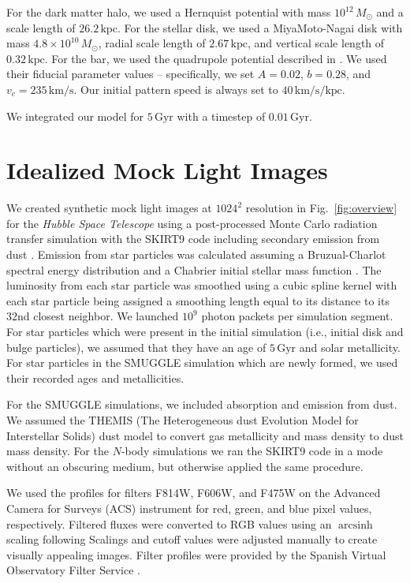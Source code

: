 \documentclass[fleqn,usenatbib]{mnras}
\newcommand{\kms}{\ensuremath{\textrm{km}/\textrm{s}}}
\newcommand{\Nbody}{$N$-body}
\newcommand{\Msun}{\ensuremath{M_{\odot}}}
\DeclareMathOperator\arcsinh{arcsinh}
\begin{document}
For the dark matter halo, we used a Hernquist potential
\citep{1990ApJ...356..359H} with mass $10^{12}\,\Msun$ and a scale length of
$26.2\,\textrm{kpc}$. For the stellar disk, we used a MiyaMoto-Nagai disk
\citep{1975PASJ...27..533M} with mass $4.8\times10^{10}\,\Msun$, radial scale
length of $2.67\,\textrm{kpc}$, and vertical scale length of
$0.32\,\textrm{kpc}$. For the bar, we used the quadrupole potential described in
\citet{2022MNRAS.513..768C}. We used their fiducial parameter values --
specifically, we set $A=0.02$, $b=0.28$, and $v_c = 235\,\kms$. Our initial
pattern speed is always set to $40\,\kms/\textrm{kpc}$.

We integrated our model for $5\,\textrm{Gyr}$ with a timestep of
$0.01\,\textrm{Gyr}$.

\section{Idealized Mock Light Images}
\label{app:hst}
We created synthetic mock light images at $1024^2$ resolution in
Fig.~\ref{fig:overview} for the \textit{Hubble Space Telescope} using a
post-processed Monte Carlo radiation transfer simulation with the SKIRT9 code
including secondary emission from dust \citep{2020AC....3100381C}. Emission from
star particles was calculated assuming a Bruzual-Charlot spectral energy
distribution \citep{2003MNRAS.344.1000B} and a Chabrier initial stellar mass
function \citep{2003PASP..115..763C}. The luminosity from each star particle was
smoothed using a cubic spline kernel with each star particle being assigned a
smoothing length equal to its distance to its $32$nd closest neighbor. We
launched $10^9$ photon packets per simulation segment. For star particles
which were present in the initial simulation (i.e., initial disk and bulge
particles), we assumed that they have an age of $5\,\textrm{Gyr}$ and solar
metallicity. For star particles in the SMUGGLE simulation which are newly
formed, we used their recorded ages and metallicities.

For the SMUGGLE simulations, we included absorption and emission from dust. We
assumed the THEMIS (The Heterogeneous dust Evolution Model for Interstellar
Solids) dust model \citep{2017AA...602A..46J} to convert gas metallicity and
mass density to dust mass density. For the \Nbody{} simulations we ran the
SKIRT9 code in a mode without an obscuring medium, but otherwise applied the
same procedure.

We used the profiles for filters F814W, F606W, and F475W on the Advanced
Camera for Surveys (ACS) instrument for red, green, and blue pixel values,
respectively. Filtered fluxes were converted to RGB values using an $\arcsinh$
scaling following \citet{2004PASP..116..133L} Scalings and cutoff values
were adjusted manually to create visually appealing images. Filter profiles
were provided by the Spanish Virtual Observatory Filter
Service \citep{2012ivoa.rept.1015R, 2020sea..confE.182R}.
\end{document}
